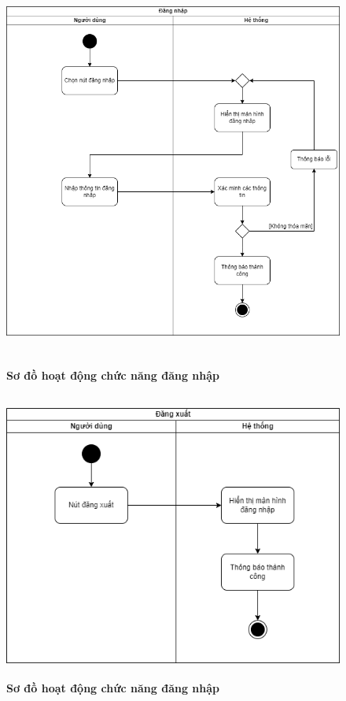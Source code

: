   \begin{figure}[H]
    \centering
    \includegraphics[width=13.5cm,height=13cm]{Images/activity/activity_login.png}
    \caption[Sơ đồ hoạt động chức năng đăng nhập]{\bfseries \fontsize{12pt}{0pt}
    \selectfont Sơ đồ hoạt động chức năng đăng nhập}
    \label{activity_login} %
  \end{figure}

  \begin{figure}[H]
    \centering
    \includegraphics[width=11.5cm,height=9.5cm]{Images/activity/activity_logout.png}
    \caption[Sơ đồ hoạt động chức năng đăng nhập]{\bfseries \fontsize{12pt}{0pt}
    \selectfont Sơ đồ hoạt động chức năng đăng nhập}
    \label{activity_logout} %
  \end{figure}

